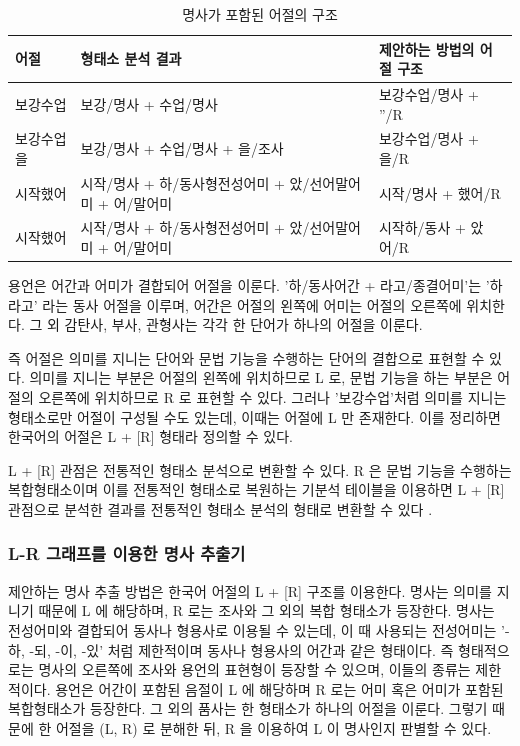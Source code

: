 \documentclass[11pt]{article}
\begin{document}
\begin{table}[ht]
\centering
\caption{명사가 포함된 어절의 구조}
\label{tab:three_example_of_begin}
\begin{tabular}{|l|l|l|}
\hline
\rowcolor[HTML]{EFEFEF} 
\textbf{어절} & \textbf{형태소 분석 결과} & \textbf{제안하는 방법의 어절 구조} \\ \hline
보강수업 & 보강/명사 + 수업/명사 & 보강수업/명사 + ''/R \\ \hline
보강수업을 & 보강/명사 + 수업/명사 + 을/조사 & 보강수업/명사 + 을/R \\ \hline
시작했어 & 시작/명사 + 하/동사형전성어미 + 았/선어말어미 + 어/말어미 & 시작/명사 + 했어/R \\ \hline
시작했어 & 시작/명사 + 하/동사형전성어미 + 았/선어말어미 + 어/말어미 & 시작하/동사 + 았어/R \\ \hline
\end{tabular}
\end{table}

용언은 어간과 어미가 결합되어 어절을 이룬다.
'하/동사어간 + 라고/종결어미'는 '하라고' 라는 동사 어절을 이루며, 어간은 어절의 왼쪽에 어미는 어절의 오른쪽에 위치한다.
그 외 감탄사, 부사, 관형사는 각각 한 단어가 하나의 어절을 이룬다.

즉 어절은 의미를 지니는 단어와 문법 기능을 수행하는 단어의 결합으로 표현할 수 있다.
의미를 지니는 부분은 어절의 왼쪽에 위치하므로 L 로, 문법 기능을 하는 부분은 어절의 오른쪽에 위치하므로 R 로 표현할 수 있다.
그러나 '보강수업'처럼 의미를 지니는 형태소로만 어절이 구성될 수도 있는데, 이때는 어절에 L 만 존재한다.
이를 정리하면 한국어의 어절은 L + [R] 형태라 정의할 수 있다.

L + [R] 관점은 전통적인 형태소 분석으로 변환할 수 있다.
R 은 문법 기능을 수행하는 복합형태소이며 이를 전통적인 형태소로 복원하는 기분석 테이블을 이용하면 L + [R] 관점으로 분석한 결과를 전통적인 형태소 분석의 형태로 변환할 수 있다 \citep{shim2013syllable}.


\subsubsection{L-R 그래프를 이용한 명사 추출기}

제안하는 명사 추출 방법은 한국어 어절의 L + [R] 구조를 이용한다.
명사는 의미를 지니기 때문에 L 에 해당하며, R 로는 조사와 그 외의 복합 형태소가 등장한다.
명사는 전성어미와 결합되어 동사나 형용사로 이용될 수 있는데, 이 때 사용되는 전성어미는 '-하, -되, -이, -있' 처럼 제한적이며 동사나 형용사의 어간과 같은 형태이다.
즉 형태적으로는 명사의 오른쪽에 조사와 용언의 표현형이 등장할 수 있으며, 이들의 종류는 제한적이다.
용언은 어간이 포함된 음절이 L 에 해당하며 R 로는 어미 혹은 어미가 포함된 복합형태소가 등장한다.
그 외의 품사는 한 형태소가 하나의 어절을 이룬다.
그렇기 때문에 한 어절을 (L, R) 로 분해한 뒤, R 을 이용하여 L 이 명사인지 판별할 수 있다.
\end{document}
